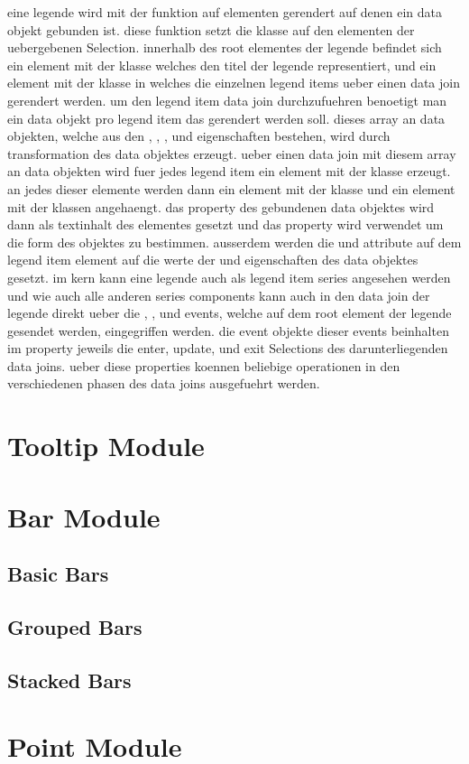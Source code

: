 eine legende wird mit der  funktion auf elementen gerendert auf denen ein  data objekt gebunden ist.
diese funktion setzt die  klasse auf den elementen der uebergebenen Selection.
innerhalb des root elementes der legende befindet sich ein  element mit der  klasse welches den titel der legende representiert, und ein  element mit der  klasse in welches die einzelnen legend items ueber einen data join gerendert werden.
um den legend item data join durchzufuehren benoetigt man ein data objekt pro legend item das gerendert werden soll.
dieses array an  data objekten, welche aus den , , , und  eigenschaften bestehen, wird durch transformation des  data objektes erzeugt.
ueber einen data join mit diesem array an data objekten wird fuer jedes legend item ein  element mit der  klasse erzeugt.
an jedes dieser  elemente werden dann ein  element mit der  klasse und ein  element mit der  klassen angehaengt.
das  property des gebundenen  data objektes wird dann als textinhalt des  elementes gesetzt und das  property wird verwendet um die form des  objektes zu bestimmen.
ausserdem werden die  und  attribute auf dem  legend item element auf die werte der  und  eigenschaften des data objektes gesetzt.
im kern kann eine legende auch als legend item series angesehen werden und wie auch alle anderen series components kann auch in den data join der legende direkt ueber die , , und  events, welche auf dem root element der legende gesendet werden, eingegriffen werden.
die event objekte dieser events beinhalten im  property jeweils die enter, update, und exit Selections des darunterliegenden data joins.
ueber diese properties koennen beliebige operationen in den verschiedenen phasen des data joins ausgefuehrt werden.




\section{Tooltip Module}

\section{Bar Module}

\subsection{Basic Bars}

\subsection{Grouped Bars}

\subsection{Stacked Bars}

\section{Point Module}